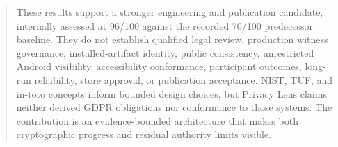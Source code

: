\documentclass[11pt,a4paper]{article}
\begin{document}
\begin{abstract}
These results support a stronger engineering and publication candidate, internally assessed at 96/100 against the recorded 70/100 predecessor baseline. They do not establish qualified legal review, production witness governance, installed-artifact identity, public consistency, unrestricted Android visibility, accessibility conformance, participant outcomes, long-run reliability, store approval, or publication acceptance. NIST, TUF, and in-toto concepts inform bounded design choices, but Privacy Lens claims neither derived GDPR obligations nor conformance to those systems. The contribution is an evidence-bounded architecture that makes both cryptographic progress and residual authority limits visible.
\end{abstract}
\newpage
\tableofcontents
\newpage







{\small


}
\end{document}
